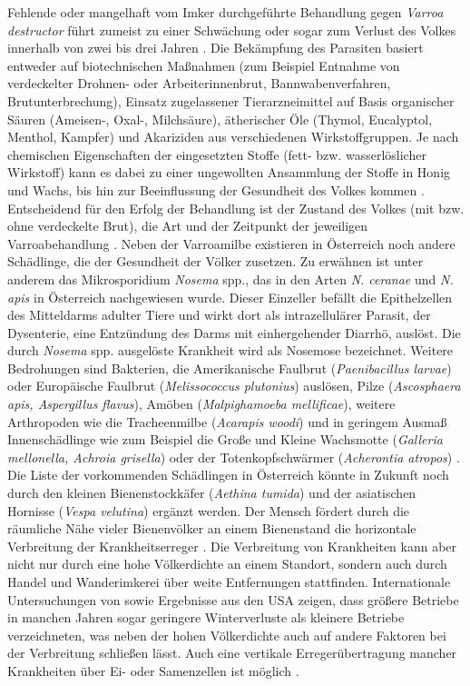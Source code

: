 Fehlende oder mangelhaft vom Imker durchgeführte Behandlung gegen \textit{Varroa destructor} führt zumeist zu einer Schwächung oder sogar zum Verlust des Volkes innerhalb von zwei bis drei Jahren \citep{rosenkranz2010}. Die Bekämpfung des Parasiten basiert entweder auf biotechnischen Maßnahmen (zum Beispiel Entnahme von verdeckelter Drohnen- oder Arbeiterinnenbrut, Bannwabenverfahren, Brutunterbrechung), Einsatz zugelassener Tierarzneimittel auf Basis organischer Säuren (Ameisen-, Oxal-, Milchsäure), ätherischer Öle (Thymol, Eucalyptol, Menthol, Kampfer) und Akariziden aus verschiedenen Wirkstoffgruppen. Je nach chemischen Eigenschaften der eingesetzten Stoffe (fett- bzw. wasserlöslicher Wirkstoff) kann es dabei zu einer ungewollten Ansammlung der Stoffe in Honig und Wachs, bis hin zur Beeinflussung der Gesundheit des Volkes kommen \citep{rosenkranz2010, noel2020}. Entscheidend für den Erfolg der Behandlung ist der Zustand des Volkes (mit bzw. ohne verdeckelte Brut), die Art und der Zeitpunkt der jeweiligen Varroabehandlung \citep{brodschneider2013, vanderzee2014}.
\newline
Neben der Varroamilbe existieren in Österreich noch andere Schädlinge, die der Gesundheit der Völker zusetzen. Zu erwähnen ist unter anderem das Mikrosporidium \textit{Nosema} spp., das in den Arten \textit{N. ceranae} und \textit{N. apis} in Österreich nachgewiesen wurde. Dieser Einzeller befällt die Epithelzellen des Mitteldarms adulter Tiere und wirkt dort als intrazellulärer Parasit, der Dysenterie, eine Entzündung des Darms mit einhergehender Diarrhö, auslöst. Die durch \textit{Nosema} spp. ausgelöste Krankheit wird als Nosemose bezeichnet. Weitere Bedrohungen sind Bakterien, die Amerikanische Faulbrut (\textit{Paenibacillus larvae}) oder Europäische Faulbrut (\textit{Melissococcus plutonius}) auslösen, Pilze (\textit{Ascosphaera apis, Aspergillus flavus}), Amöben (\textit{Malpighamoeba mellificae}), weitere Arthropoden wie die Tracheenmilbe (\textit{Acarapis woodi}) und in geringem Ausmaß Innenschädlinge wie zum Beispiel die Große und Kleine Wachsmotte (\textit{Galleria mellonella, Achroia grisella}) oder der Totenkopfschwärmer (\textit{Acherontia atropos}) \citep{brodschneider2011}. Die Liste der vorkommenden Schädlingen in Österreich könnte in Zukunft noch durch den kleinen Bienenstockkäfer (\textit{Aethina tumida}) \citep{neumann2016} und der asiatischen Hornisse (\textit{Vespa velutina}) \citep{monceau2014} ergänzt werden.
\newline
Der Mensch fördert durch die räumliche Nähe vieler Bienenvölker an einem Bienenstand die horizontale Verbreitung der Krankheitserreger \citep{seeley2015, degrandi-hoffman2015, forfert2016}. Die Verbreitung von Krankheiten kann aber nicht nur durch eine hohe Völkerdichte an einem Standort, sondern auch durch Handel und Wanderimkerei über weite Entfernungen stattfinden. Internationale Untersuchungen von \cite{vanderzee2012, vanderzee2014} sowie Ergebnisse aus den USA \citep{steinhauer2014,lee2015} zeigen, dass größere Betriebe in manchen Jahren sogar geringere Winterverluste als kleinere Betriebe verzeichneten, was neben der hohen Völkerdichte auch auf andere Faktoren bei der Verbreitung schließen lässt. Auch eine vertikale Erregerübertragung mancher Krankheiten über Ei- oder Samenzellen ist möglich \citep{peng2015, yue2007}.
